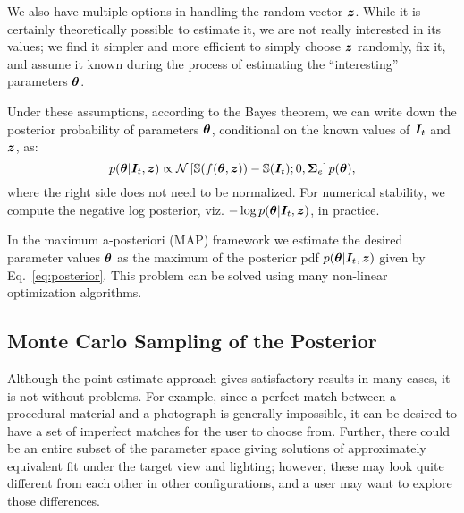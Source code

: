 We also have multiple options in handling the random vector $\bm{z}$. While it is certainly theoretically possible to estimate it, we are not really interested in its values;  we find it simpler and more efficient to simply choose $\bm{z}$ randomly, fix it, and assume it known during the process of estimating the ``interesting'' parameters $\bm{\theta}$.

Under these assumptions, according to the Bayes theorem, we can write down the posterior probability of parameters $\bm{\theta}$, conditional on the known values of $\bm{I}_t$ and $\bm{z}$, as:
%
\begin{equation} \label{eq:posterior}
	p(\bm{\theta} | \bm{I}_t, \bm{z}) \propto \mathcal{N}\left[\mathbb{S}(f(\bm{\theta}, \bm{z})) - \mathbb{S}(\bm{I}_t); 0, \bm{\Sigma}_e\right] p(\bm{\theta}),
\end{equation}
%
where the right side does not need to be normalized. %
For numerical stability, we compute the negative log posterior, viz. $-\log p(\bm{\theta} | \bm{I}_t, \bm{z})$, in practice.

In the maximum a-posteriori (MAP) framework we estimate the desired parameter values $\bm{\theta}$ as the maximum of the posterior pdf $p(\bm{\theta} | \bm{I}_t, \bm{z})$ given by Eq.~\eqref{eq:posterior}. This problem can be solved using many non-linear optimization algorithms.




\subsection{Monte Carlo Sampling of the Posterior}
\label{ssec:bayesian}
%
Although the point estimate approach gives satisfactory results in many cases, it is not without problems. For example, since a perfect match between a procedural material and a photograph is generally impossible, it can be desired to have a set of imperfect matches for the user to choose from. Further, there could be an entire subset of the parameter space giving solutions of approximately equivalent fit under the target view and lighting; however, these may look quite different from each other in other configurations, and a user may want to explore those differences.

